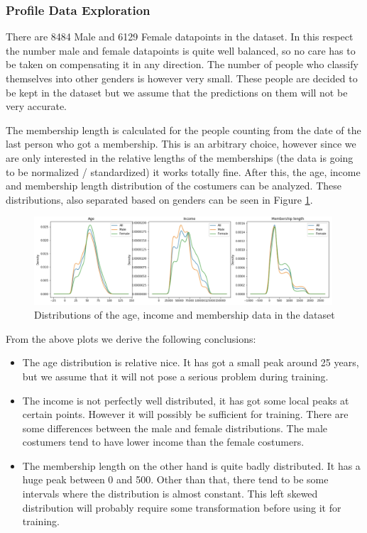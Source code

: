 \subsubsection{Profile Data Exploration}
There are 8484 Male and 6129 Female datapoints in the dataset. In this respect the number male and female datapoints is quite well balanced, so no care has to be taken on compensating it in any direction. The number of people who classify themselves into other genders is however very small. These people are decided to be kept in the dataset but we assume that the predictions on them will not be very accurate.

The membership length is calculated for the people counting from the date of the last person who got a membership. This is an arbitrary choice, however since we are only interested in the relative lengths of the memberships (the data is going to be normalized / standardized) it works totally fine. After this, the age, income and membership length distribution of the costumers can be analyzed. These distributions, also separated based on genders can be seen in Figure \ref{fig4}.

\begin{figure}[h]
	\centering
	\includegraphics[width=0.99\textwidth]{fig/profile_distributions.jpg}
	\vspace*{-0.1in}
	\caption{Distributions of the age, income and membership data in the dataset}
	\label{fig4}
	\vspace*{-0.2in}
	\bigskip
\end{figure}

From the above plots we derive the following conclusions:
\begin{itemize}
	\item The age distribution is relative nice. It has got a small peak around 25 years, but we assume that it will not pose a serious problem during training.
	\item The income is not perfectly well distributed, it has got some local peaks at certain points. However it will possibly be sufficient for training. There are some differences between the male and female distributions. The male costumers tend to have lower income than the female costumers.
	\item The membership length on the other hand is quite badly distributed. It has a huge peak between 0 and 500. Other than that, there tend to be some intervals where the distribution is almost constant. This left skewed distribution will probably require some transformation before using it for training.
\end{itemize}

